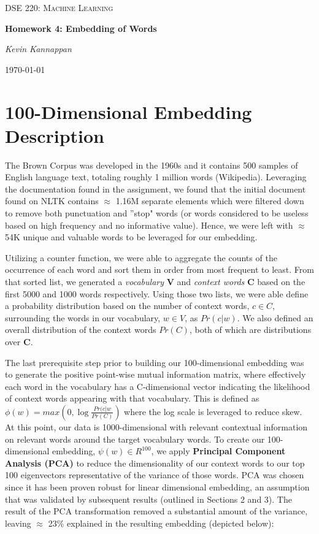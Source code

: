 \documentclass[12pt]{article}
\theoremstyle{plain}
\theoremstyle{definition}
\numberwithin{equation}{theorem}
\begin{document}
\begin{titlepage}
	\centering
	\vspace{4cm}
	{\scshape\Large DSE 220: Machine Learning\par}
	\vspace{1.5cm}
	{\huge\bfseries Homework 4: Embedding of Words\par}
	\vspace{2cm}
	{\Large\itshape Kevin Kannappan\par}

	{\large \today\par}
\end{titlepage}


\section{100-Dimensional Embedding Description}

The Brown Corpus was developed in the 1960s and it contains 500 samples of English language text, totaling roughly 1 million words (Wikipedia). Leveraging the documentation found in the assignment, we found that the initial document found on NLTK contains $\approx$ 1.16M separate elements which were filtered down to remove both punctuation and ''stop" words (or words considered to be useless based on high frequency and no informative value). Hence, we were left with $\approx$ 54K unique and valuable words to be leveraged for our embedding.

\bigskip
Utilizing a counter function, we were able to aggregate the counts of the occurrence of each word and sort them in order from most frequent to least. From that sorted list, we generated a \textit{vocabulary} \textbf{V} and \textit{context words} \textbf{C} based on the first 5000 and 1000 words respectively. Using those two lists, we were able define a probability distribution based on the number of context words, $c \in C$, surrounding the words in our vocabulary, $w \in V$, as $Pr(c|w)$. We also defined an overall distribution of the context words $Pr(C)$, both of which are distributions over \textbf{C}.

\bigskip
The last prerequisite step prior to building our 100-dimensional embedding was to generate the positive point-wise mutual information matrix, where effectively each word in the vocabulary has a C-dimensional vector indicating the likelihood of context words appearing with that vocabulary. This is defined as $\phi (w) = max(0,\log \frac{Pr(c|w}{Pr(C)})$ where the log scale is leveraged to reduce skew. At this point, our data is 1000-dimensional with relevant contextual information on relevant words around the target vocabulary words. To create our 100-dimensional embedding, $\psi(w) \in R^{100}$, we apply \textbf{Principal Component Analysis (PCA)} to reduce the dimensionality of our context words to our top 100 eigenvectors representative of the variance of those words. PCA was chosen since it has been proven robust for linear dimensional embedding, an assumption that was validated by subsequent results (outlined in Sections 2 and 3). The result of the PCA transformation removed a substantial amount of the variance, leaving $\approx$ 23\% explained in the resulting embedding (depicted below):
\bigskip
\end{document}
